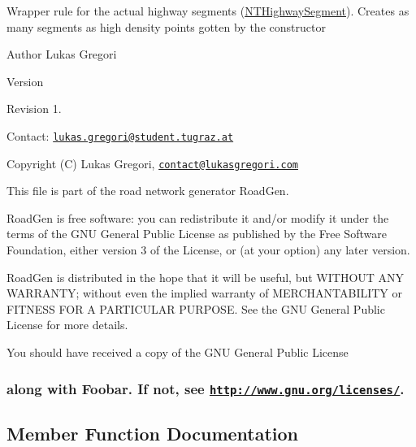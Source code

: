 Wrapper rule for the actual highway segments (\hyperlink{class_n_t_highway_segment}{N\+T\+Highway\+Segment}). Creates as many segments as high density points gotten by the constructor

\begin{DoxyAuthor}{Author}
Lukas Gregori 
\end{DoxyAuthor}
\begin{DoxyVersion}{Version}

\end{DoxyVersion}
\begin{DoxyParagraph}{Revision}
1. 
\end{DoxyParagraph}


Contact\+: \href{mailto:lukas.gregori@student.tugraz.at}{\tt lukas.\+gregori@student.\+tugraz.\+at}



 Copyright (C) Lukas Gregori, \href{mailto:contact@lukasgregori.com}{\tt contact@lukasgregori.\+com}

This file is part of the road network generator Road\+Gen.

Road\+Gen is free software\+: you can redistribute it and/or modify it under the terms of the G\+NU General Public License as published by the Free Software Foundation, either version 3 of the License, or (at your option) any later version.

Road\+Gen is distributed in the hope that it will be useful, but W\+I\+T\+H\+O\+UT A\+NY W\+A\+R\+R\+A\+N\+TY; without even the implied warranty of M\+E\+R\+C\+H\+A\+N\+T\+A\+B\+I\+L\+I\+TY or F\+I\+T\+N\+E\+SS F\+OR A P\+A\+R\+T\+I\+C\+U\+L\+AR P\+U\+R\+P\+O\+SE. See the G\+NU General Public License for more details.

You should have received a copy of the G\+NU General Public License \subsubsection*{along with Foobar. If not, see \href{http://www.gnu.org/licenses/}{\tt http\+://www.\+gnu.\+org/licenses/}. }

\subsection{Member Function Documentation}
\hypertarget{class_n_t_highway_a5a33cf5f76b36a1d62685408306a54c9}{}\label{class_n_t_highway_a5a33cf5f76b36a1d62685408306a54c9} 
